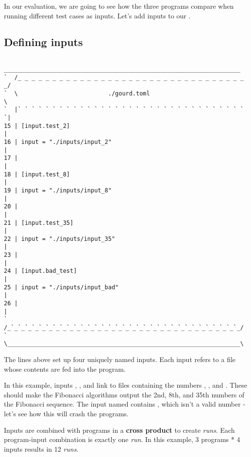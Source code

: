 \documentclass[a4paper,english]{article}
\begin{document}
\begin{adjustwidth}{18pt}{0pt}
    In our evaluation, we are going to see how the three programs compare when
    running different test cases as inputs.
    Let's add inputs to our .

    \subsection{Defining inputs}

    \begin{verbatim}
    ____________________________________________________________________
`  /_ _ _ _ _ _ _ _ _ _ _ _ _ _ _ _ _ _ _ _ _ _ _ _ _ _ _ _ _ _ _ _ _ _/
`  \                          ./gourd.toml                             \
`  |` ` ` ` ` ` ` ` ` ` ` ` ` ` ` ` ` ` ` ` ` ` ` ` ` ` ` ` ` ` ` ` ` `|
15 | [input.test_2]                                                    |
16 | input = "./inputs/input_2"                                        |
17 |                                                                   |
18 | [input.test_8]                                                    |
19 | input = "./inputs/input_8"                                        |
20 |                                                                   |
21 | [input.test_35]                                                   |
22 | input = "./inputs/input_35"                                       |
23 |                                                                   |
24 | [input.bad_test]                                                  |
25 | input = "./inputs/input_bad"                                      |
26 |                                                                   |
`  /_`_`_`_`_`_`_`_`_`_`_`_`_`_`_`_`_`_`_`_`_`_`_`_`_`_`_`_`_`_`_`_`_`_/
`  \___________________________________________________________________\

    \end{verbatim}

    The lines above set up four uniquely named inputs.
    Each input refers to a file whose contents are fed into the program.

    In this example, inputs , , and 
    link to files containing the numbers \File{2}, \File{8}, and \File{35}.
    These should make the Fibonacci algorithms output the 2nd, 8th, and 35th
    numbers of the Fibonacci sequence.
    The input named  contains , which isn't
    a valid number - let's see how this will crash the programs.

    Inputs are combined with programs in a \textbf{cross product} to create
    \emph{runs}.
    Each program-input combination is exactly one \emph{run}.
    In this example, 3 programs * 4 inputs results in 12 \emph{runs}.


\end{adjustwidth}
\end{document}
